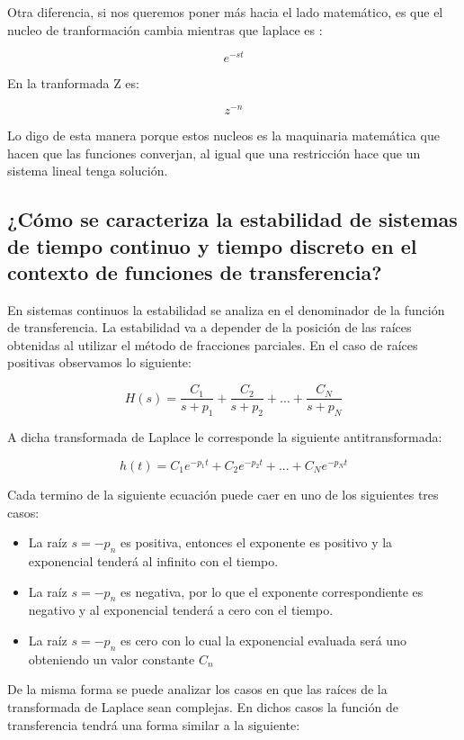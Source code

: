 Otra diferencia, si nos queremos poner más hacia el lado matemático, es que el nucleo de tranformación cambia mientras que laplace es :

$$e^{-st}$$

En la tranformada Z es:

$$z^{-n}$$

Lo digo de esta manera porque estos nucleos es la maquinaria matemática que hacen que las funciones converjan, al igual que una restricción hace que un sistema lineal tenga solución.
		
\subsection{¿Cómo se caracteriza la estabilidad de sistemas de tiempo continuo y tiempo discreto en el contexto de funciones de transferencia?}

En sistemas continuos la estabilidad se analiza en el denominador de la función de transferencia. La estabilidad va a depender de la posición de las raíces obtenidas al utilizar el método de fracciones parciales. En el caso de raíces positivas observamos lo siguiente:

\begin{equation}
H(s)=\frac{C_1}{s+p_1}+\frac{C_2}{s+p_2}+...+\frac{C_N}{s+p_N}
\end{equation}

A dicha transformada de Laplace le corresponde la siguiente antitransformada:

\begin{equation}
h(t)=C_1e^{-p_1t}+C_2e^{-p_2t}+...+C_Ne^{-p_Nt}
\end{equation}

Cada termino de la siguiente ecuación puede caer en uno de los siguientes tres casos:

\begin{itemize}
\item La raíz $s=-p_n$ es positiva, entonces el exponente es positivo y la exponencial tenderá al infinito con el tiempo.
\item La raíz $s=-p_n$ es negativa, por lo que el exponente correspondiente es negativo y al exponencial tenderá a cero con el tiempo.
\item La raíz $s=-p_n$ es cero con lo cual la exponencial evaluada será uno obteniendo un valor constante $C_n$
\end{itemize}

De la misma forma se puede analizar los casos en que las raíces de la transformada de Laplace sean complejas. En dichos casos la función de transferencia tendrá una forma similar a la siguiente:

